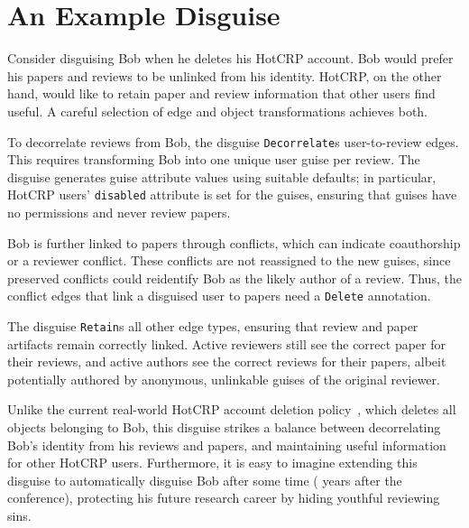 \section{An Example Disguise}
\label{design:eg}
%
Consider disguising Bob when he deletes his HotCRP account.
%
Bob would prefer his papers and reviews to be unlinked from his identity.
%
HotCRP, on the other hand, would like to retain paper and review information that other users
find useful.
%
A careful selection of edge and object transformations achieves both.
%

%
To decorrelate reviews from Bob, the disguise \texttt{Decorrelate}s user-to-review edges.
%
This requires transforming Bob into one unique user guise per review.
%
The disguise generates guise attribute values using suitable defaults;
%
in particular, HotCRP users' \texttt{disabled} attribute is set for the guises,
ensuring that guises have no permissions and never review papers.
%

%
Bob is further linked to papers through conflicts, which can indicate coauthorship or a
reviewer conflict.
%
These conflicts are not reassigned to the new guises, since preserved
conflicts could reidentify Bob as the likely author of a review. Thus, the
conflict edges that link a disguised user to papers need a \texttt{Delete} annotation.
%

The disguise \texttt{Retain}s all other edge types, ensuring that review and paper
artifacts remain correctly linked. Active reviewers still see the correct paper for their reviews,
and active authors see the correct reviews for their papers, albeit potentially authored by
anonymous, unlinkable guises of the original reviewer.
%
%

%
Unlike the current real-world HotCRP account deletion policy~\cite{hotcrp:privacy}, which
deletes all objects belonging to Bob, this disguise strikes a balance between decorrelating
Bob's identity from his reviews and papers, and maintaining useful information for other
HotCRP users.
%
Furthermore, it is easy to imagine extending this disguise to automatically disguise Bob
after some time ( years after the conference), protecting his future research career
by hiding youthful reviewing sins.
%


